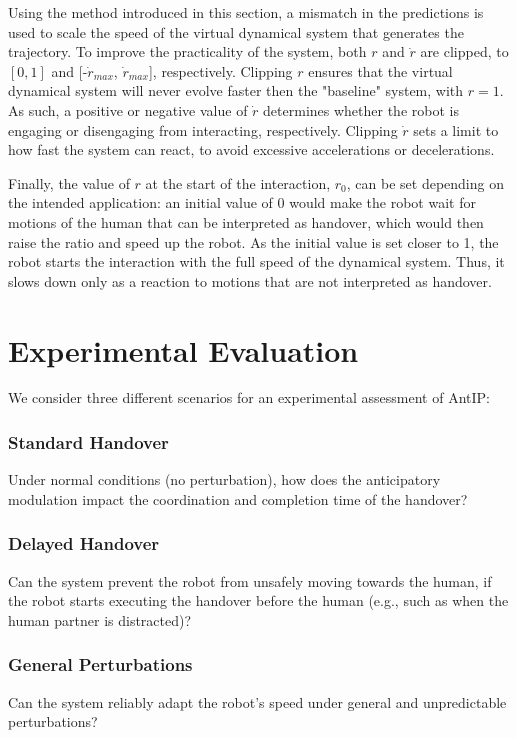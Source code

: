 \documentclass[lettersize,journal]{IEEEtran}
\begin{document}
Using the method introduced in this section, a mismatch in the predictions is used to scale the speed of the virtual dynamical system that generates the trajectory.
To improve the practicality of the system, both $r$ and $\dot r$ are clipped, to $[0,1]$ and [-$\dot r_{max}$, $\dot r_{max}$], respectively.
Clipping $r$ ensures that the virtual dynamical system will never evolve faster then the "baseline" system, with $r=1$.
As such, a positive or negative value of $\dot r$ determines whether the robot is engaging or disengaging from interacting, respectively.
Clipping $\dot r$ sets a limit to how fast the system can react, to avoid excessive accelerations or decelerations.

Finally, the value of $r$ at the start of the interaction, $r_0$, can be set depending on the intended application: an initial value of 0 would make the robot wait for motions of the human that can be interpreted as handover, which would then raise the ratio and speed up the robot. 
As the initial value is set closer to 1, the robot starts the interaction with the full speed of the dynamical system.
Thus, it slows down only as a reaction to motions that are not interpreted as handover.

\section{Experimental Evaluation}

\noindent
We consider three different scenarios for an experimental assessment of AntIP:
\subsubsection{Standard Handover}
Under normal conditions (no perturbation), how does the anticipatory modulation impact the coordination and completion time of the handover?
\subsubsection{Delayed Handover}
Can the system prevent the robot from unsafely moving towards the human, if the robot starts executing the handover before the human (e.g., such as when the human partner is distracted)?
\subsubsection{General Perturbations}
Can the system reliably adapt the robot's speed under general and unpredictable perturbations?
\end{document}
